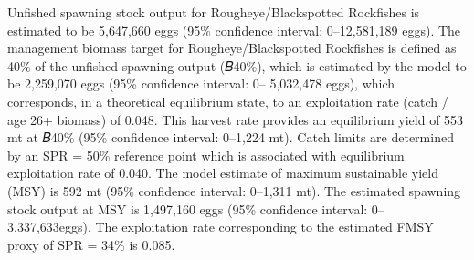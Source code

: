 \documentclass[
]{scrartcl}
\begin{document}
Unfished spawning stock output for Rougheye/Blackspotted Rockfishes is
estimated to be 5,647,660 eggs (95\% confidence interval: 0--12,581,189
eggs). The management biomass target for Rougheye/Blackspotted
Rockfishes is defined as 40\% of the unfished spawning output (𝐵40\%),
which is estimated by the model to be 2,259,070 eggs (95\% confidence
interval: 0-- 5,032,478 eggs), which corresponds, in a theoretical
equilibrium state, to an exploitation rate (catch / age 26+ biomass) of
0.048. This harvest rate provides an equilibrium yield of 553 mt at
𝐵40\% (95\% confidence interval: 0--1,224 mt). Catch limits are
determined by an SPR = 50\% reference point which is associated with
equilibrium exploitation rate of 0.040. The model estimate of maximum
sustainable yield (MSY) is 592 mt (95\% confidence interval: 0--1,311
mt). The estimated spawning stock output at MSY is 1,497,160 eggs (95\%
confidence interval: 0--3,337,633eggs). The exploitation rate
corresponding to the estimated FMSY proxy of SPR = 34\% is 0.085.

\clearpage

\begingroup
\fontsize{9.0pt}{10.8pt}\selectfont
\end{document}
